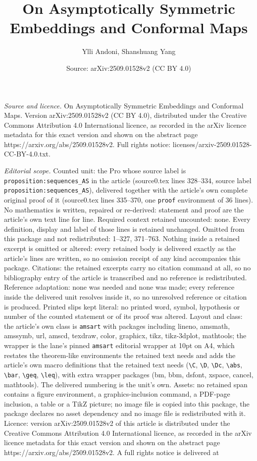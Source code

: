 \documentclass[10pt,a4paper]{amsart}
\title[On Asymptotically Symmetric Embeddings and Conformal Maps]{On Asymptotically Symmetric Embeddings and Conformal Maps}
\author{Ylli Andoni, Shanshuang Yang}
\date{Source: arXiv:2509.01528v2 (CC BY 4.0)}
\begin{document}
\maketitle

\noindent\emph{Source and licence.} On Asymptotically Symmetric Embeddings and Conformal Maps. Version arXiv:2509.01528v2 (CC BY 4.0), distributed under the Creative Commons Attribution 4.0 International licence, as recorded in the arXiv licence metadata for this exact version and shown on the abstract page https://arxiv.org/abs/2509.01528v2. Full rights notice: licenses/arxiv-2509.01528-CC-BY-4.0.txt.\par\smallskip

\noindent\textit{Editorial scope.} Counted unit: the Pro whose source label is \texttt{proposition:sequences\_AS} in the article (source0.tex lines 328--334, source label \texttt{proposition:sequences\_AS}), delivered together with the article's own complete original proof of it (source0.tex lines 335--370, one \texttt{proof} environment of 36 lines). No mathematics is written, repaired or re-derived: statement and proof are the article's own text line for line. Required context retained uncounted: none. Every definition, display and label of those lines is retained unchanged. Omitted from this package and not redistributed: 1--327, 371--763. Nothing inside a retained excerpt is omitted or altered: every retained body is delivered exactly as the article's lines are written, so no omission receipt of any kind accompanies this package. Citations: the retained excerpts carry no citation command at all, so no bibliography entry of the article is transcribed and no reference is redistributed. Reference adaptation: none was needed and none was made; every reference inside the delivered unit resolves inside it, so no unresolved reference or citation is produced. Printed slips kept literal: no printed word, symbol, hypothesis or number of the counted statement or of its proof was altered. Layout and class: the article's own class is \texttt{amsart} with packages including lineno, amsmath, amssymb, url, amscd, texdraw, color, graphicx, tikz, tikz-3dplot, mathtools; the wrapper is the lane's pinned \texttt{amsart} editorial wrapper at 10pt on A4, which restates the theorem-like environments the retained text needs and adds the article's own macro definitions that the retained text needs (\texttt{\textbackslash C}, \texttt{\textbackslash D}, \texttt{\textbackslash Dc}, \texttt{\textbackslash abs}, \texttt{\textbackslash bar}, \texttt{\textbackslash geq}, \texttt{\textbackslash leq}), with extra wrapper packages (bm, bbm, dsfont, xspace, cancel, mathtools). The delivered numbering is the unit's own. Assets: no retained span contains a figure environment, a graphics-inclusion command, a PDF-page inclusion, a table or a TikZ picture; no image file is copied into this package, the package declares no asset dependency and no image file is redistributed with it. Licence: version arXiv:2509.01528v2 of this article is distributed under the Creative Commons Attribution 4.0 International licence, as recorded in the arXiv licence metadata for this exact version and shown on the abstract page https://arxiv.org/abs/2509.01528v2. A full rights notice is delivered at 
\end{document}
